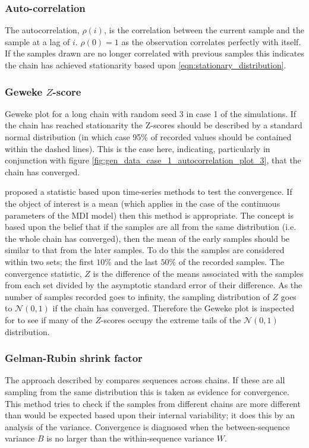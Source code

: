 \documentclass[12pt]{article} %
\begin{document}
\subsubsection{Auto-correlation} \label{sec:additional_theory:sub_sec:convergence:sub_sub_sec:autocorrelation}
The autocorrelation, $\rho(i)$, is the correlation between the current sample and the sample at a lag of $i$. $\rho(0)=1$ as the observation correlates perfectly with itself. If the samples drawn are no longer correlated with previous samples this indicates the chain has achieved stationarity based upon \eqref{eqn:stationary_distribution}.

\subsubsection{Geweke $Z$-score} \label{sec:additional_theory:sub_sec:convergence:sub_sub_sec:geweke}
Geweke plot \cite{GewekeEvaluatingAccuracySamplingBased} for a long chain with random seed 3 in case 1 of the simulations. If the chain has reached stationarity the Z-scores should be described by a standard normal distribution (in which case 95\% of recorded values should be contained within the dashed lines). This is the case here, indicating, particularly in conjunction with figure \ref{fig:gen_data_case_1_autocorrelation_plot_3}, that the chain has converged.

\citet{GewekeEvaluatingAccuracySamplingBased} proposed a statistic based upon time-series methods to test the convergence. If the object of interest is a mean (which applies in the case of the continuous parameters of the MDI model) then this method is appropriate. The concept is based upon the belief that if the samples are all from the same distribution (i.e. the whole chain has converged), then the mean of the early samples should be similar to that from the later samples. To do this the samples are considered within two sets; the first $10\%$ and the last $50\%$ of the recorded samples.  The convergence statistic, $Z$ is the difference of the means associated with the samples from each set divided by the asymptotic standard error of their difference. As the number of samples recorded goes to infinity, the sampling distribution of $Z$ goes to $\mathcal{N}(0,1)$ if the chain has converged. Therefore the Geweke plot is inspected for to see if many of the $Z$-scores occupy the extreme tails of the $\mathcal{N}(0,1)$ distribution.

\subsubsection{Gelman-Rubin shrink factor}
\label{sec:additional_theory:sub_sec:convergence:sub_sub_sec:gelman}
The approach described by \citet{GelmanInferenceIterativeSimulation1992} compares sequences across chains. If these are all sampling from the same distribution this is taken as evidence for convergence. This method tries to check if the samples from different chains are more different than would be expected based upon their internal variability; it does this by an analysis of the variance. Convergence is diagnosed when the between-sequence variance $B$ is no larger than the within-sequence variance $W$.
\end{document}

